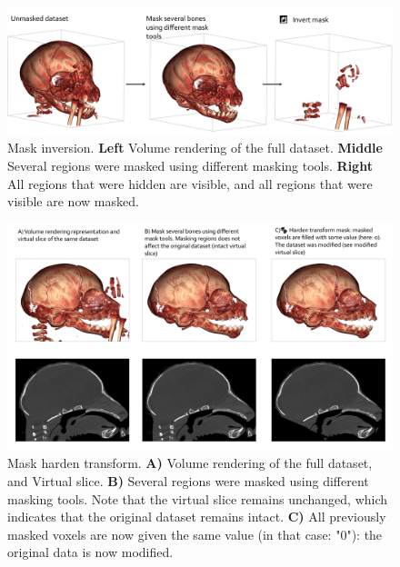 \begin{figure}
  \centering
  \includegraphics[scale=0.2]{images/14/invert_mask/invert_mask.png}
\caption{Mask inversion.  \textbf{Left} Volume rendering of the full dataset. \textbf{Middle} Several regions were masked using different masking tools. \textbf{Right} All regions that were hidden are visible, and all regions that were visible are now masked.}	 
\label{invert_mask}
 \end{figure}

\begin{figure}
  \centering
  \includegraphics[scale=0.17]{images/14/harden_mask/harden_example.png}
\caption{Mask harden transform.  \textbf{A)} Volume rendering of the full dataset, and Virtual slice. \textbf{B)} Several regions were masked using different masking tools. Note that the virtual slice remains unchanged, which indicates that the original dataset remains intact. \textbf{C)} All previously masked voxels are now given the same value (in that case: "0"): the original data is now modified.}	 
\label{harden_example}
 \end{figure}



